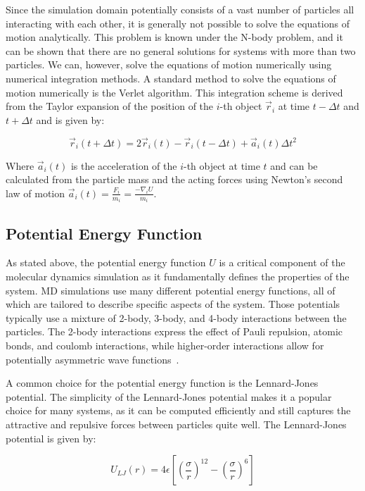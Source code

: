 Since the simulation domain potentially consists of a vast number of particles all interacting with each other, it is generally not possible to solve the equations of motion analytically. This problem is known under the N-body problem, and it can be shown that there are no general solutions for systems with more than two particles. We can, however, solve the equations of motion numerically using numerical integration methods. A standard method to solve the equations of motion numerically is the Verlet algorithm. This integration scheme is derived from the Taylor expansion of the position of the $i$-th object $\vec{r}_i$ at time $t - \Delta t$ and $t + \Delta t$ and is given by:

\begin{equation}
      \vec{r}_i(t + \Delta t) = 2 \vec{r}_i(t) - \vec{r}_i(t - \Delta t) + \vec{a}_i(t) \Delta t^2
\end{equation}

Where $\vec{a}_i(t)$ is the acceleration of the $i$-th object at time $t$ and can be calculated from the particle mass and the acting forces using Newton's second law of motion $\vec{a}_i(t) =\frac{F_i}{m_i}= \frac{-\nabla_i U}{m_i}$.

\subsection{Potential Energy Function}

As stated above, the potential energy function $U$ is a critical component of the molecular dynamics simulation as it fundamentally defines the properties of the system. MD simulations use many different potential energy functions, all of which are tailored to describe specific aspects of the system. Those potentials typically use a mixture of 2-body, 3-body, and 4-body interactions between the particles. The 2-body interactions express the effect of Pauli repulsion, atomic bonds, and coulomb interactions, while higher-order interactions allow for potentially asymmetric wave functions~\cite{Leimkuhler2015}.

A common choice for the potential energy function is the Lennard-Jones potential. The simplicity of the Lennard-Jones potential makes it a popular choice for many systems, as it can be computed efficiently and still captures the attractive and repulsive forces between particles quite well. The Lennard-Jones potential is given by:

\begin{equation}
      U_{LJ}(r) = 4 \epsilon \left[ \left( \frac{\sigma}{r} \right)^{12} - \left( \frac{\sigma}{r} \right)^6 \right]
\end{equation}


